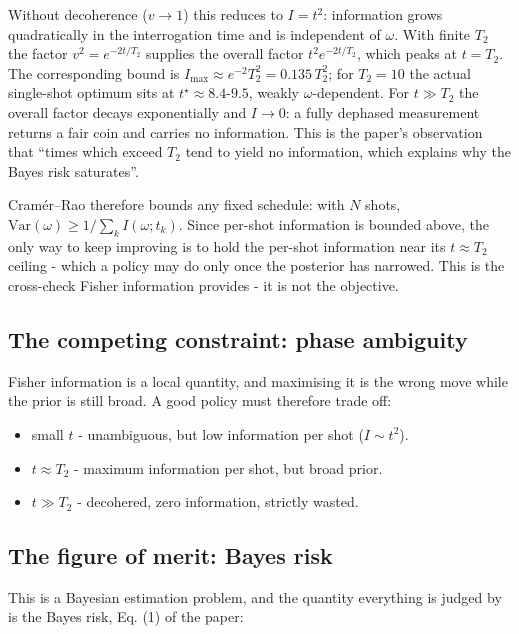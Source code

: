 \documentclass[12pt,a4paper]{article}
\begin{document}
Without decoherence ($v \to 1$) this reduces to $I = t^2$: information grows quadratically in the
interrogation time and is independent of $\omega$. With finite $T_2$ the factor $v^2 =
e^{-2t/T_2}$ supplies the overall factor $t^2 e^{-2t/T_2}$, which peaks at $t = T_2$. The corresponding
bound is $I_{\max} \approx e^{-2}T_2^2 = 0.135\,T_2^2$; for $T_2 = 10$ the actual single-shot
optimum sits at $t^\star \approx 8.4$-$9.5$, weakly $\omega$-dependent. For $t \gg T_2$ the
overall factor decays exponentially and $I \to 0$: a fully dephased measurement returns a fair coin and
carries no information. This is the paper's observation that ``times which exceed $T_2$ tend to
yield no information, which explains why the Bayes risk saturates''.

Cram\'er--Rao therefore bounds any fixed schedule: with $N$ shots,
$\mathrm{Var}(\omega) \ge 1/\sum_k I(\omega; t_k)$. Since per-shot information is bounded above,
the only way to keep improving is to hold the per-shot information near its $t \approx T_2$
ceiling - which a policy may do only once the posterior has narrowed.
 This is the cross-check Fisher information provides - it is not the objective.


\subsection{The competing constraint: phase ambiguity}
\label{sec:the-competing-constraint-phase-ambiguity}
Fisher information is a local quantity, and maximising it is the wrong move while the prior
is still broad.
A good policy must therefore trade off:

\begin{itemize}
  \item small $t$ - unambiguous, but low information per shot ($I \sim t^2$).
  \item $t \approx T_2$ - maximum information per shot, but broad prior.
  \item $t \gg T_2$ - decohered, zero information, strictly wasted.
\end{itemize}

\subsection{The figure of merit: Bayes risk}
\label{sec:the-figure-of-merit-bayes-risk}
This is a Bayesian estimation problem, and the quantity everything is judged by is the Bayes risk,
Eq. (1) of the paper:
\end{document}
